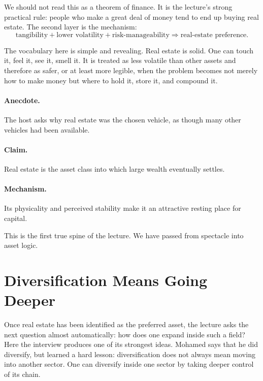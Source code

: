 We should not read this as a theorem of finance. It is the lecture's strong practical rule: people who make a great deal of money tend to end up buying real estate. The second layer is the mechanism:
\begin{equation}
\text{tangibility} + \text{lower volatility} + \text{risk-manageability}
\Longrightarrow
\text{real-estate preference}.
\end{equation}

The vocabulary here is simple and revealing. Real estate is solid. One can touch it, feel it, see it, smell it. It is treated as less volatile than other assets and therefore as safer, or at least more legible, when the problem becomes not merely how to make money but where to hold it, store it, and compound it.

\paragraph{Anecdote.} The host asks why real estate was the chosen vehicle, as though many other vehicles had been available.

\paragraph{Claim.} Real estate is the asset class into which large wealth eventually settles.

\paragraph{Mechanism.} Its physicality and perceived stability make it an attractive resting place for capital.

This is the first true spine of the lecture. We have passed from spectacle into asset logic.

\section{Diversification Means Going Deeper}

Once real estate has been identified as the preferred asset, the lecture asks the next question almost automatically: how does one expand inside such a field? Here the interview produces one of its strongest ideas. Mohamed says that he did diversify, but learned a hard lesson: diversification does not always mean moving into another sector. One can diversify inside one sector by taking deeper control of its chain.

